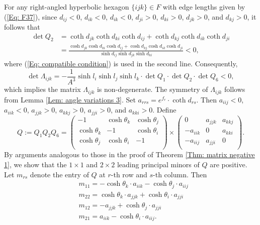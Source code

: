 \documentclass[12pt]{amsart}
\theoremstyle{definition}
\begin{document}
For any right-angled hyperbolic hexagon $\{ijk\}\in F$ with edge lengths given by (\ref{Eq: F37}),
since $d_{ij}<0$, $d_{ik}<0$, $d_{ik}<0$, $d_{ji}>0$, $d_{ki}>0$, $d_{jk}>0$, and $d_{kj}>0$, it follows that
\begin{align*}
\det Q_2&=\coth d_{jk}\coth d_{ki}\coth d_{ij}+\coth d_{kj}\coth d_{ik}\coth d_{ji}\\
&=\frac{\cosh d_{jk}\cosh d_{ki}\cosh d_{ij}+\cosh d_{kj}\cosh d_{ik}\cosh d_{ji}}{\sinh d_{ij}\sinh d_{jk}\sinh d_{ki}}<0,
\end{align*}
where (\ref{Eq: compatible condition}) is used in the second line.
Consequently,
\begin{equation*}
\det\Lambda_{ijk}
=-\frac{1}{A^3}\sinh l_i\sinh l_j\sinh l_k\cdot\det Q_1
\cdot\det Q_2
\cdot\det Q_6
<0,
\end{equation*}
which implies the matrix $\Lambda_{ijk}$ is non-degenerate.
The symmetry of $\Lambda_{ijk}$ follows from Lemma \ref{Lem: angle variations 3}.
Set $a_{rrs}=e^{f_r}\cdot\coth d_{rs}$.
Then $a_{iij}<0$, $a_{iik}<0$, $a_{jjk}>0$, $a_{kkj}>0$, $a_{jji}>0$, and $a_{kki}>0$.
Define
\begin{equation*}
Q:=Q_1Q_2Q_6
=\left(
   \begin{array}{ccc}
     -1 & \cosh\theta_k & \cosh\theta_j \\
     \cosh\theta_k & -1 & \cosh\theta_i \\
     \cosh\theta_j & \cosh\theta_i & -1 \\
   \end{array}
 \right)
 \times
  \left(
   \begin{array}{ccc}
     0 & a_{jjk} & a_{kkj} \\
     -a_{iik} & 0 & a_{kki} \\
     -a_{iij} & a_{jji} & 0 \\
   \end{array}
   \right).
\end{equation*}
By arguments analogous to those in the proof of Theorem \ref{Thm: matrix negative 1}, 
we show that the $1\times 1$ and $2\times 2$ leading principal minors of $Q$ are positive. 
Let $m_{rs}$ denote the entry of $Q$ at $r$-th row and $s$-th column.
Then
\begin{equation*}
\begin{aligned}
&m_{11}=-\cosh \theta_k\cdot a_{iik}-\cosh \theta_j\cdot a_{iij}\\
&m_{22}=\cosh \theta_k\cdot a_{jjk}+\cosh \theta_i\cdot a_{jji}\\
&m_{12}=-a_{jjk}+\cosh \theta_j\cdot a_{jji}\\
&m_{21}=a_{iik}-\cosh \theta_i\cdot a_{iij}.
\end{aligned}
\end{equation*}
\end{document}
